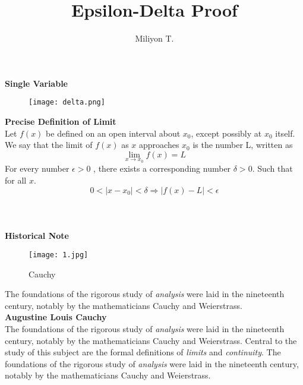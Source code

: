 \documentclass[12pt]{article}
\begin{document}
\nocite{}

\title{Epsilon-Delta Proof}

\author{Miliyon T.}
\maketitle
\textcolor[rgb]{1.00,0.00,0.00}{\textbf{{\Large Single Variable}}}\\

\begin{wrapfigure}{l}{0.41\textwidth}
		\texttt{[image: delta.png]}
		\\	%
	\end{wrapfigure}

\textbf{\large Precise Definition of Limit}\\
Let $f(x)$ be defined on an open interval about $x_0$, except possibly at $x_0$ itself. We say that the limit of $f(x)$ as $x$ approaches $x_0$ is the number L, written as
$$
\lim_{x\rightarrow x_0} f(x)=L
$$
For every number $\epsilon >0$ , there exists a corresponding number $\delta >0$. Such that for all $x$.
$$0<|x-x_0|<\delta\Rightarrow|f(x)-L|<\epsilon$$
\\
\\
\\

\textcolor[rgb]{0.50,0.50,0.00}{\textbf{{\Large Historical Note }}}
\\
\begin{wrapfigure}{l}{0.3\textwidth}
		\texttt{[image: 1.jpg]}
\caption{Cauchy}\label{fig:1}	
\end{wrapfigure}

The foundations of the rigorous study of \emph{analysis}
were laid in the nineteenth century, notably by the
mathematicians Cauchy and Weierstrass. \\
\textcolor[rgb]{0.00,0.00,1}{\textbf{Augustine Louis Cauchy}} \\
The foundations of the rigorous study of \emph{analysis}
were laid in the nineteenth century, notably by the
mathematicians Cauchy and Weierstrass. Central to the
study of this subject are the formal definitions of
\emph{limits} and \emph{continuity}.
The foundations of the rigorous study of \emph{analysis}
were laid in the nineteenth century, notably by the
mathematicians Cauchy and Weierstrass.
\\
\\
\\
\end{document}
